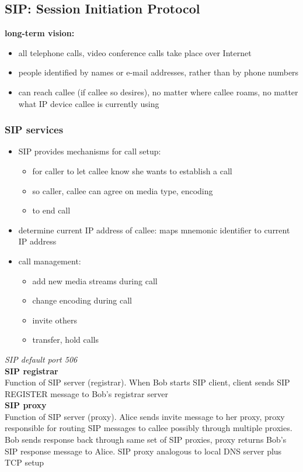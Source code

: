 \subsection{SIP: Session Initiation Protocol}\label{sec:sip}
\textbf{long-term vision:}
\begin{itemize}
	\item all telephone calls, video conference calls take place over Internet
	\item people identified by names or e-mail addresses, rather than by phone numbers
	\item can reach callee (if callee so desires), no matter where callee roams, no matter what IP device callee is currently using
\end{itemize}
\subsubsection{SIP services}
\begin{itemize}
	\item SIP provides mechanisms for call setup:
	\begin{itemize}
		\item for caller to let callee know she wants to establish a call
		\item so caller, callee can agree on media type, encoding
		\item to end call
	\end{itemize}
	\item determine current IP address of callee: maps mnemonic identifier to current IP address
	\item call management:
	\begin{itemize}
		\item add new media streams during call
		\item change encoding during call
		\item invite others
		\item transfer, hold calls
	\end{itemize}
\end{itemize}
\textit{SIP default port 506}\\
\textbf{SIP registrar}\\
Function of SIP server (registrar). When Bob starts SIP client, client sends SIP REGISTER message to Bob's registrar server\\
\textbf{SIP proxy}\\
Function of SIP server (proxy). Alice sends invite message to her proxy, proxy responsible for routing SIP messages to callee possibly through multiple proxies. Bob sends response back through same set of SIP proxies, proxy returns Bob's SIP response message to Alice. SIP proxy analogous to local DNS server plus TCP setup

